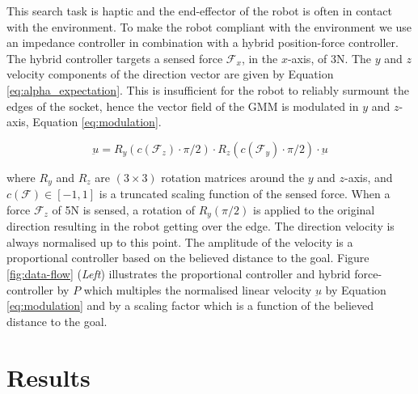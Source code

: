 \documentclass[final,5p,times,twocolumn]{elsarticle}
\begin{document}
This search task is haptic and the end-effector of the robot is often in contact with the environment. To make the robot
compliant with the environment we use an impedance controller in combination with a hybrid position-force controller. The hybrid controller
targets a sensed force $\mathcal{F}_x$, in the $x$-axis, of 3N. The $y$ and $z$ velocity components of the direction vector are given by 
Equation \ref{eq:alpha_expectation}. This is insufficient for the robot to reliably surmount the edges of the socket,
hence the vector field of the GMM is modulated in $y$ and $z$-axis, Equation \ref{eq:modulation}.

\begin{equation}
  \underbar{u} = R_y(c(\mathcal{F}_z) \cdot \pi/2) \cdot R_z(c(\mathcal{F}_y) \cdot \pi/2) \cdot \underbar{u} \label{eq:modulation}
\end{equation}

where $R_y$ and $R_z$ are $(3 \times 3)$ rotation matrices around the $y$ and $z$-axis, and $c(\mathcal{F}) \in [-1,1]$ is a truncated scaling function of the sensed 
force.  When a force $\mathcal{F}_z$ of 5N is sensed, a rotation of $R_y(\pi/2)$ is applied to the original direction resulting in the robot
getting over the edge. The direction velocity is always normalised up to this point. The amplitude of the velocity is a proportional
controller based on the believed distance to the goal. Figure \ref{fig:data-flow} (\textit{Left}) illustrates the proportional controller and hybrid force-controller 
by $P$ which multiples the normalised linear velocity $\underbar{u}$ by Equation \ref{eq:modulation} and by a scaling factor which is a function of the believed distance to the goal.


\section{Results}\label{sec:results}
\end{document}
